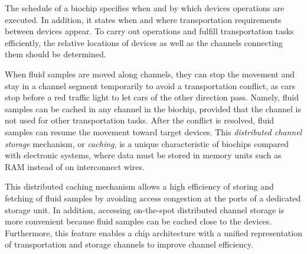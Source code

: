 \label{sec:arch_syn}

The schedule of a biochip specifies when and by which devices operations are executed. 
In addition, it states
when and where transportation requirements between devices appear.
To carry out operations and fulfill transportation tasks efficiently, 
the relative locations of devices as well as the
channels connecting them should be determined. 

When fluid samples are moved along channels, they can stop the movement 
and stay in a channel segment temporarily to avoid a transportation conflict,
as cars stop before a red traffic light to let cars of the other direction 
pass. Namely, fluid samples can be cached in any channel in the biochip, 
provided that the channel is not used for other transportation tasks. 
After the conflict is resolved, fluid samples can resume the movement  
toward target devices. This \textit{distributed channel storage} mechanism,
or \textit{caching}, is a unique characteristic of biochips
compared with %
electronic systems, where data must be stored in memory units such as RAM instead
of on interconnect wires.  

This distributed caching mechanism allows a high efficiency of storing and fetching of
fluid samples by avoiding access congestion at the ports of a dedicated storage
unit. In addition, accessing on-the-spot distributed channel storage 
is more convenient because fluid samples can be cached close to the devices. 
Furthermore, this feature enables a chip architecture with
a unified representation of transportation and storage channels to
improve channel efficiency. 


